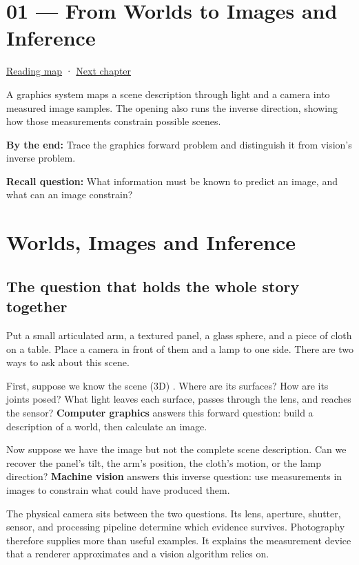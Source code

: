 \hypertarget{03-visual-computing-i-ch001}{}
\chapter{01 --- From Worlds to Images and Inference}\label{03-visual-computing-i-ch001-from-worlds-to-images-and-inference}

\hyperref[volume-reading-map]{Reading map} · \hyperref[03-visual-computing-i-ch002]{Next chapter}

A graphics system maps a scene description through light and a camera into measured image samples. The opening also runs the inverse direction, showing how those measurements constrain possible scenes.

\textbf{By the end:} Trace the graphics forward problem and distinguish it from vision's inverse problem.

\textbf{Recall question:} What information must be known to predict an image, and what can an image constrain?

\chapter{Worlds, Images and Inference}\label{03-visual-computing-i-ch001-worlds-images-and-inference}

\section{The question that holds the whole story together}\label{03-visual-computing-i-ch001-the-question-that-holds-the-whole-story-together}

Put a small articulated arm, a textured panel, a glass sphere, and a piece of cloth on a table. Place a camera in front of them and a lamp to one side. There are two ways to ask about this scene.

First, suppose we know the scene (3D) . Where are its surfaces? How are its joints posed? What light leaves each surface, passes through the lens, and reaches the sensor? \textbf{Computer graphics} answers this forward question: build a description of a world, then calculate an image.

Now suppose we have the image but not the complete scene description. Can we recover the panel's tilt, the arm's position, the cloth's motion, or the lamp direction? \textbf{Machine vision} answers this inverse question: use measurements in images to constrain what could have produced them.

The physical camera sits between the two questions. Its lens, aperture, shutter, sensor, and processing pipeline determine which evidence survives. Photography therefore supplies more than useful examples. It explains the measurement device that a renderer approximates and a vision algorithm relies on.

